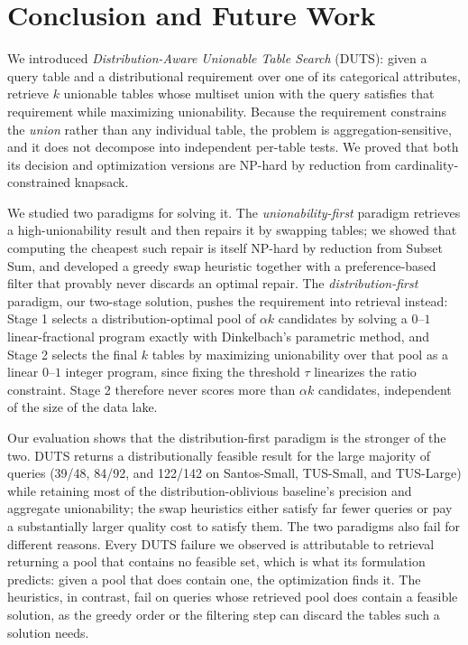 
\section{Conclusion and Future Work}

We introduced \emph{Distribution-Aware Unionable Table Search} (DUTS): given a query table
and a distributional requirement over one of its categorical attributes, retrieve $k$
unionable tables whose multiset union with the query satisfies that requirement while
maximizing unionability. Because the requirement constrains the \emph{union} rather than any
individual table, the problem is aggregation-sensitive, and it does not decompose into
independent per-table tests. We proved that both its decision and optimization versions are
NP-hard by reduction from cardinality-constrained knapsack.

We studied two paradigms for solving it. The \emph{unionability-first} paradigm retrieves a
high-unionability result and then repairs it by swapping tables; we showed that computing the
cheapest such repair is itself NP-hard by reduction from Subset Sum, and developed a greedy
swap heuristic together with a preference-based filter that provably never discards an
optimal repair. The \emph{distribution-first} paradigm, our two-stage solution, pushes the
requirement into retrieval instead: Stage 1 selects a distribution-optimal pool of $\alpha k$
candidates by solving a $0$--$1$ linear-fractional program exactly with Dinkelbach's
parametric method, and Stage 2 selects the final $k$ tables by maximizing unionability over
that pool as a linear $0$--$1$ integer program, since fixing the threshold $\tau$ linearizes
the ratio constraint. Stage 2 therefore never scores more than $\alpha k$ candidates,
independent of the size of the data lake.

Our evaluation shows that the distribution-first paradigm is the stronger of the two. DUTS
returns a distributionally feasible result for the large majority of queries (39/48, 84/92,
and 122/142 on Santos-Small, TUS-Small, and TUS-Large) while retaining most of the
distribution-oblivious baseline's precision and aggregate unionability; the swap heuristics
either satisfy far fewer queries or pay a substantially larger quality cost to satisfy them.
The two paradigms also fail for different reasons. Every DUTS failure we observed is
attributable to retrieval returning a pool that contains no feasible set, which is what its
formulation predicts: given a pool that does contain one, the optimization finds it. The
heuristics, in contrast, fail on queries whose retrieved pool does contain a feasible
solution, as the greedy order or the filtering step can discard the tables such a solution
needs.

